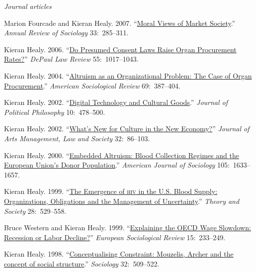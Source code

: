 \documentclass[11pt]{article}
\begin{document}
\normalsize

\bigskip
\noindent\emph{Journal articles \vspace{0.05in}}
 

\ind Marion Fourcade and Kieran Healy. 2007. ``\href{http://arjournals.annualreviews.org/doi/pdf/10.1146/annurev.soc.33.040406.131642}{Moral Views of Market Society}.'' \emph{Annual Review of Sociology} 33:~285--311. 

\ind Kieran Healy. 2006. ``\href{http://www.kieranhealy.org/files/papers/presumed-consent.pdf}{Do Presumed Consent Laws Raise Organ Procurement Rates?}'' \emph{DePaul Law Review} 55:~1017--1043. 

\ind Kieran Healy. 2004. ``\href{http://www.kieranhealy.org/files/papers/asr2004.pdf}{Altruism as an Organizational Problem: The Case of Organ Procurement}.''
 \emph{American Sociological Review} 69:~387--404.

\ind Kieran Healy. 2002. ``\href{http://www.kieranhealy.org/files/papers/jpp.pdf}{Digital Technology and Cultural Goods}.'' \emph{Journal of
  Political Philosophy} 10:~478--500. 

\ind Kieran Healy. 2002. ``\href{http://www.kieranhealy.org/files/papers/culture-newecon.pdf}{What's New for Culture in the New Economy?}'' \emph{Journal
  of Arts Management, Law and Society} 32:~86--103. 


\ind Kieran Healy. 2000. ``\href{http://www.kieranhealy.org/files/papers/embed-alt.pdf}{Embedded Altruism: Blood Collection Regimes and the European
  Union's Donor Population}.'' \emph{American Journal of Sociology} 105:~1633--\,1657.


\ind Kieran Healy. 1999.  ``\href{http://www.kieranhealy.org/files/papers/ts.pdf}{The Emergence of \textsc{hiv} in the U.S. Blood Supply: Organizations,
  Obligations and the Management of Uncertainty}.'' \emph{Theory and Society} 28:~529--558.


\ind Bruce Western and Kieran Healy. 1999. ``\href{http://www.kieranhealy.org/files/papers/western-healy99.pdf}{Explaining the OECD Wage Slowdown:
Recession or Labor Decline?}''  \emph{European Sociological Review}
15:~233--249.


\ind  Kieran Healy. 1998.  ``\href{http://www.kieranhealy.org/files/papers/constraint98.pdf}{Conceptualising Constraint: Mouzelis, Archer and the concept of
  social structure}.'' \emph{Sociology} 32:~509--522. 
\end{document}
